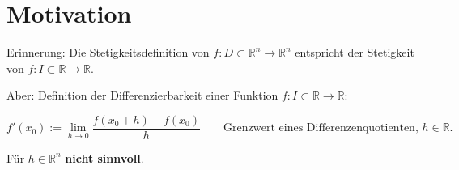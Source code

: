 \section*{Motivation}
\label{sec:Einleitung4}

Erinnerung: Die Stetigkeitsdefinition von $f: D \subset \mathbb{R}^n \to \mathbb{R}^n$ entspricht der Stetigkeit von $f: I \subset \mathbb{R} \to \mathbb{R}$.

Aber: Definition der Differenzierbarkeit einer Funktion $f: I \subset \mathbb{R} \to \mathbb{R}$:

$$
f'(x_0) := \lim_{h \to 0} \frac{f(x_0 + h) - f(x_0)}{h}
\qquad\text{Grenzwert eines Differenzenquotienten, } h \in \mathbb{R}.
$$

Für $h \in \mathbb{R}^n$ \textbf{nicht sinnvoll}.

\newpage